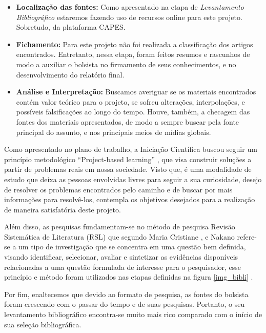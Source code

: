 \begin{itemize}
\item \textbf{Localização das fontes:} Como apresentado na etapa de  \textit{Levantamento Bibliográfico} estaremos fazendo uso de recursos online para este projeto. Sobretudo, da plataforma CAPES.

\item \textbf{Fichamento:} Para este projeto não foi realizada a classificação dos artigos encontrados. Entretanto, nessa etapa, foram feitos resumos e rascunhos de modo a auxiliar o bolsista no firmamento de seus conhecimentos, e no desenvolvimento do relatório final.

\item \textbf{Análise e Interpretação:} Buscamos averiguar se os materiais encontrados contém valor teórico para o projeto, se sofreu alterações, interpolações, e possíveis falsificações ao longo do tempo. Houve, também, a checagem das fontes dos materiais apresentados, de modo a sempre buscar pela fonte principal do assunto, e nos principais meios de mídias globais.


\end{itemize}

 
Como apresentado no plano de trabalho, a Iniciação Científica buscou seguir um princípio metodológico “Project-based learning” \cite{krajcik2006project}, que visa construir soluções a partir de problemas reais em nossa sociedade. Visto que, é uma modalidade de estudo que deixa as pessoas envolvidas livres para seguir a sua curiosidade, desejo de resolver os problemas encontrados pelo caminho e de buscar por mais informações para resolvê-los, contempla os objetivos desejados para a realização de maneira satisfatória deste projeto. 

Além disso, as pesquisas fundamentam-se no método de pesquisa Revisão Sistemática de Literatura (RSL) que segundo Maria Cristiane \cite{revi3}, e Nakano \cite{revi2} refere-se a um tipo de investigação que se concentra em uma questão bem definida, visando identificar, selecionar, avaliar e sintetizar as evidências disponíveis relacionadas a uma questão formulada de interesse para o pesquisador, esse princípio e método foram utilizados nas etapas definidas na figura \ref{img_bibli} .

Por fim, enaltecemos que devido ao formato de pesquisa, as fontes do bolsista foram crescendo com o passar do tempo e de suas pesquisas. Portanto, o seu levantamento bibliográfico encontra-se muito mais rico comparado com o início de sua seleção bibliográfica.


\vspace {1cm}

